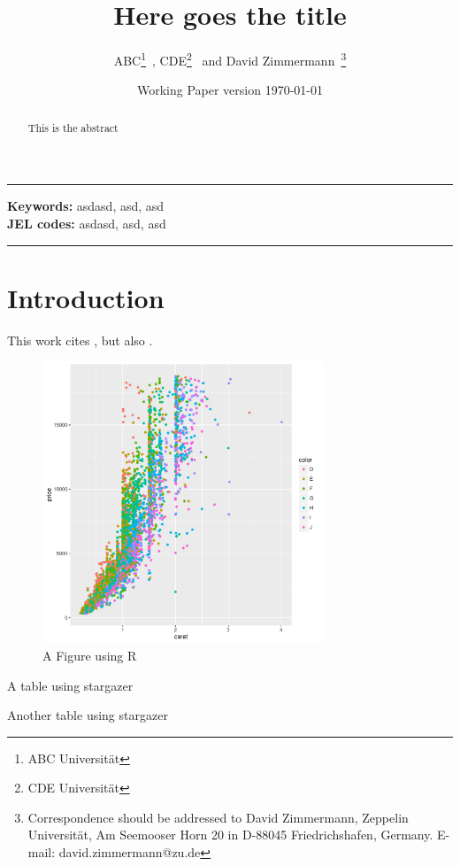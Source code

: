 \documentclass[12pt, a4paper]{article}
\title{Here goes the title}
\author{ABC\thanks{ABC Universität}\ , 
CDE\thanks{CDE Universität} \ and 
David Zimmermann\footnotemark[2]\
 \thanks{Correspondence should be addressed to David Zimmermann, Zeppelin Universität, Am Seemooser Horn 20 in D-88045 Friedrichshafen, Germany. E-mail: david.zimmermann@zu.de}}
\date{Working Paper version \today}
\begin{document}
\maketitle

\rule{\linewidth}{0.4pt}
\begin{abstract}
This is the abstract
\end{abstract}
\textbf{Keywords:} asdasd, asd, asd\\
\medskip
\textbf{JEL codes:} asdasd, asd, asd\\
\rule{\linewidth}{0.4pt}

\section{Introduction}
This work cites \textcite{Brealey2012}, but also \textcite{Modigliani1958}. 


\begin{figure}
\caption{A Figure using R}
\centering
\includegraphics[width=0.75\textwidth]{figures/fig1}
\end{figure}

\begin{table}
\begin{scriptsize}

\end{scriptsize}
\caption{A table using stargazer}
\end{table}

\begin{table}
\begin{scriptsize}

\end{scriptsize}
\caption{Another table using stargazer}
\end{table}

\newpage

\printbibliography
\end{document}
